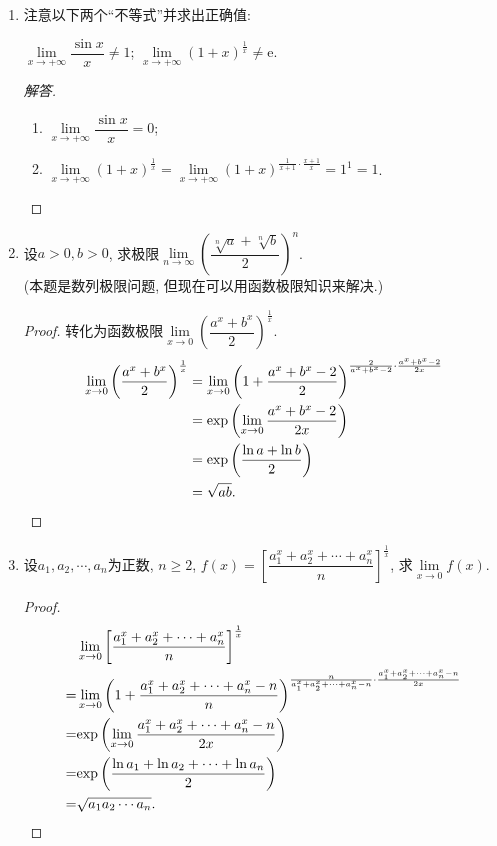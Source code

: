 \documentclass[a4paper,11pt,twoside]{ctexbook}
\newcommand{\e}{\mathrm e}
\begin{document}
\begin{enumerate}
	\item 注意以下两个``不等式''并求出正确值:
	      \begin{tabenum}[(1)]
		      \tabenumitem $\lim\limits_{x\to+\infty} \dfrac{\sin{x}}{x}\neq 1$;
		      \tabenumitem $\lim\limits_{x\to+\infty} (1+x)^{\frac{1}{x}}\neq \e$.
	      \end{tabenum}
	      \begin{proof}[解答]
		      \begin{enumerate}[(1)]
			      \item $\lim\limits_{x\to+\infty} \dfrac{\sin{x}}{x}=0$;
			      \item $\lim\limits_{x\to+\infty} (1+x)^{\frac{1}{x}}=\lim\limits_{x\to+\infty} (1+x)^{\frac{1}{x+1}\cdot\frac{x+1}{x}}=1^1=1$. \qedhere
		      \end{enumerate}
	      \end{proof}

	\item 设$a>0, b>0$, 求极限$\lim\limits_{n\to\infty} \left(\dfrac{\sqrt[n]{a}+\sqrt[n]{b}}{2}\right)^n$. \\
	      (本题是数列极限问题, 但现在可以用函数极限知识来解决.)
	      \begin{proof}
			转化为函数极限$\lim\limits_{x\to 0} \left(\dfrac{a^x+b^x}{2}\right)^{\frac{1}{x}}$.
			\[
				\begin{split}
					\lim\limits_{x\to 0} \left(\dfrac{a^x+b^x}{2}\right)^{\frac{1}{x}}&=\lim\limits_{x\to 0} \left(1+\dfrac{a^x+b^x-2}{2}\right)^{\frac{2}{a^x+b^x-2}\cdot\frac{a^x+b^x-2}{2x}}\\
					&={\rm exp}\left(\lim\limits_{x\to 0}\dfrac{a^x+b^x-2}{2x}\right)\\
					&={\rm exp}\left(\dfrac{\ln{a}+\ln{b}}{2}\right)\\
					&=\sqrt{ab}. \qedhere
				\end{split}
			\]
	      \end{proof}
	\item 设$a_1, a_2, \cdots, a_n$为正数, $n\geqslant 2$, $f(x)=\left[\dfrac{a_1^x+a_2^x+\cdots+a_n^x}{n}\right]^{\frac{1}{x}}$, 求$\lim\limits_{x\to 0} f(x)$.
		\begin{proof}
			\[
				\begin{split}
					& \lim\limits_{x\to 0} \left[\dfrac{a_1^x+a_2^x+\cdots+a_n^x}{n}\right]^{\frac{1}{x}}\\
					=& \lim\limits_{x\to 0} \left(1+\dfrac{a_1^x+a_2^x+\cdots+a_n^x-n}{n}\right)^{\frac{n}{a_1^x+a_2^x+\cdots+a_n^x-n}\cdot\frac{a_1^x+a_2^x+\cdots+a_n^x-n}{2x}}\\
					=& {\rm exp}\left(\lim\limits_{x\to 0} \dfrac{a_1^x+a_2^x+\cdots+a_n^x-n}{2x}\right)\\
					=& {\rm exp}\left(\dfrac{\ln{a_1}+\ln{a_2}+\cdots+\ln{a_n}}{2}\right)\\
					=& \sqrt{a_1a_2\cdots a_n}. \qedhere
				\end{split}
			\]
		\end{proof}
		

\end{enumerate}
\end{document}
